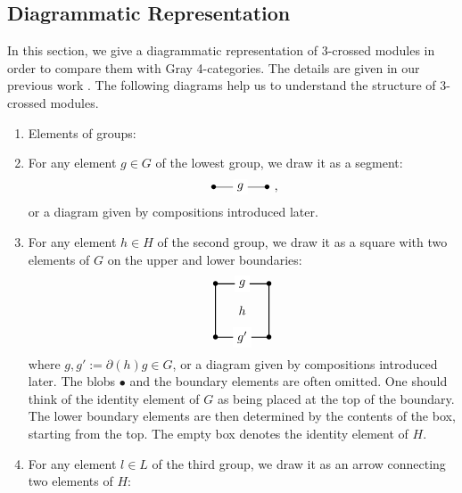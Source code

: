 \documentclass[11pt, reqno]{amsart} %
\theoremstyle{definition}
\theoremstyle{remark}
\numberwithin{equation}{section}
\begin{document}
\subsection{Diagrammatic Representation}\label{sec:3CM-Diagram}

In this section, we give a diagrammatic representation of 3-crossed modules in order to compare them with Gray 4-categories. The details are given in our previous work \cite{Fukuda:2025}. The following diagrams help us to understand the structure of 3-crossed modules.

\begin{enumerate}
  \item Elements of groups:
  \item [$\bullet$] For any element $g\in G$ of the lowest group, we draw it as a segment:
  \begin{equation}
    \label{eq:3CM-Diagram-G-elem}
    \begin{tikzpicture}[baseline=(A.base)]
      \node (A) at (-0.75,0) {$\bullet$};
      \node (B) at (0.75,0) {$\bullet$};
      \draw (A.center) to node [fill=white] {$g$} (B.center);
    \end{tikzpicture},
  \end{equation}
  or a diagram given by compositions introduced later. 
  \item [$\bullet$] For any element $h\in H$ of the second group, we draw it as a square with two elements of $G$ on the upper and lower boundaries:
  \begin{equation}
    \label{eq:3CM-Diagram-H-elem}
    \begin{tikzpicture}[baseline=(T.base)]
      \node (A) at (-0.75,0.75) {$\bullet$};
      \node (B) at (0.75,0.75) {$\bullet$};
      \node (C) at (0.75,-0.75) {$\bullet$};
      \node (D) at (-0.75,-0.75) {$\bullet$};
      \draw [thick] (A.center) to node [fill=white] {$g$} (B.center) to (C.center) to node [fill=white] {$g'$} (D.center) to cycle;
      \node (T) at (0,0) {$h$};
    \end{tikzpicture}
  \end{equation}
  where $g,g':=\partial(h)g\in G$, or a diagram given by compositions introduced later. The blobs $\bullet$ and the boundary elements are often omitted. One should think of the identity element of $G$ as being placed at the top of the boundary. The lower boundary elements are then determined by the contents of the box, starting from the top. 
  The empty box denotes the identity element of $H$.
  \item [$\bullet$] For any element $l\in L$ of the third group, we draw it as an arrow connecting two elements of $H$:

\end{enumerate}
\end{document}
